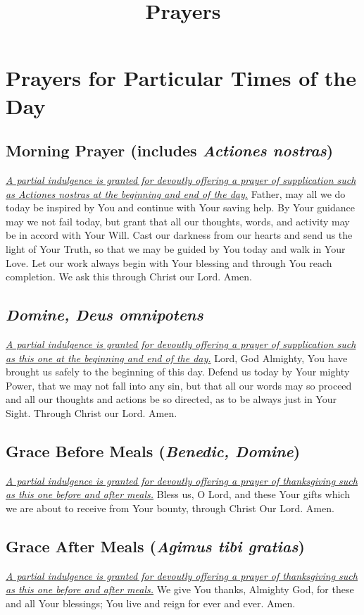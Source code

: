 \documentclass[12pt]{article}
\newcommand{\prayersection}[1]{\section{#1}}
\newcommand{\prayertitle}[1]{\subsection{#1}}
\newcommand{\indulgencedprayertitle}[1]{\prayertitle{#1 \protect\kreuz}}
\newcommand{\emphasis}[1]{\emph{#1}}
\newcommand{\emphasis}[1]{\textsl{#1}}
\newcommand{\foreign}[1]{\emphasis{#1}}
\newcommand{\note}[1]{{\small{\emphasis{#1}}}\newline}
\newcommand{\linkednote}[2]{\hyperlink{#1}{\note{#2}}}
\begin{document}
\title{\textbf{Prayers}\date{\vspace{-10ex}}}\maketitle
\tableofcontents\newpage

\prayersection{Prayers for Particular Times of the Day}
\indulgencedprayertitle{Morning Prayer (includes \foreign{Actiones nostras})}
\linkednote{grant26}{A partial indulgence is granted for devoutly offering a prayer of supplication such as \foreign{Actiones nostras} at the beginning and end of the day.}
Father, may all we do today be inspired by You and continue with Your saving help.
By Your guidance may we not fail today, but grant that all our thoughts, words, and activity may be in accord with Your Will.
Cast our darkness from our hearts and send us the light of Your Truth, so that we may be guided by You today and walk in Your Love.
Let our work always begin with Your blessing and through You reach completion.
We ask this through Christ our Lord.
Amen.

\indulgencedprayertitle{\foreign{Domine, Deus omnipotens}}
\linkednote{grant26}{A partial indulgence is granted for devoutly offering a prayer of supplication such as this one at the beginning and end of the day.}
Lord, God Almighty, You have brought us safely to the beginning of this day.
Defend us today by Your mighty Power, that we may not fall into any sin, but that all our words may so proceed and all our thoughts and actions be so directed, as to be always just in Your Sight.
Through Christ our Lord.
Amen.

\indulgencedprayertitle{Grace Before Meals (\foreign{Benedic, Domine})}
\label{prayer:grace_before_meals}
\linkednote{grant26}{A partial indulgence is granted for devoutly offering a prayer of thanksgiving such as this one before and after meals.}
Bless us, O Lord, and these Your gifts which we are about to receive from Your bounty, through Christ Our Lord.
Amen.

\indulgencedprayertitle{Grace After Meals (\foreign{Agimus tibi gratias})}
\label{prayer:grace_after_meals}
\linkednote{grant26}{A partial indulgence is granted for devoutly offering a prayer of thanksgiving such as this one before and after meals.}
We give You thanks, Almighty God, for these and all Your blessings;
You live and reign for ever and ever.
Amen.

\newpage
\end{document}
